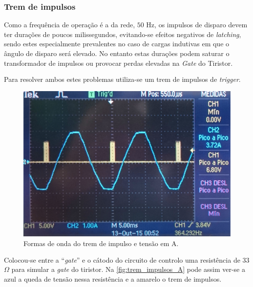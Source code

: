 \documentclass[a4paper,11pt]{article}
\numberwithin{equation}{section}
\begin{document}
\subsubsection{Trem de impulsos}

Como a frequência de operação é a da rede, $50$ Hz, os impulsos de disparo devem ter durações de poucos milissegundos, evitando-se efeitos negativos de \textit{latching}, sendo estes especialmente prevalentes no caso de cargas indutivas em que o ângulo de disparo será elevado. No entanto estas durações podem saturar o transformador de impulsos ou provocar perdas elevadas na \textit{Gate} do Tiristor.

Para resolver ambos estes problemas utiliza-se um trem de impulsos de \textit{trigger}.

\begin{figure}[H]
	\centering
	\includegraphics[keepaspectratio=true, scale=0.115]{img/figs/trem_impulsos_A}
	\caption{Formas de onda do trem de impulso e tensão em A.}
	\label{fig:trem_impulsos_A}
	\vspace{-0.8em}
\end{figure}

Colocou-se entre a ``\textit{gate}'' e o cátodo do circuito de controlo uma resistência de $33$ $\Omega$ para simular a \textit{gate} do tiristor. Na \autoref{fig:trem_impulsos_A} pode assim ver-se a azul a queda de tensão nessa resistência e a amarelo o trem de impulsos.
\end{document}
